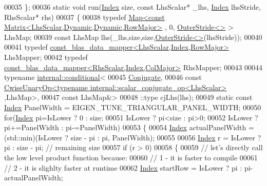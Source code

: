 \begin{DoxyCode}
00035   \};
00036   \textcolor{keyword}{static} \textcolor{keywordtype}{void} run(\hyperlink{namespace_eigen_a62e77e0933482dafde8fe197d9a2cfde}{Index} size, \textcolor{keyword}{const} LhsScalar* \_lhs, \hyperlink{namespace_eigen_a62e77e0933482dafde8fe197d9a2cfde}{Index} lhsStride, RhsScalar* rhs)
00037   \{
00038     \textcolor{keyword}{typedef} \hyperlink{group___core___module_class_eigen_1_1_map}{Map<const Matrix<LhsScalar,Dynamic,Dynamic,RowMajor>}
      , 0, \hyperlink{class_eigen_1_1_outer_stride}{OuterStride<>} > LhsMap;
00039     \textcolor{keyword}{const} LhsMap lhs(\_lhs,size,size,\hyperlink{class_eigen_1_1_outer_stride}{OuterStride<>}(lhsStride));
00040 
00041     \textcolor{keyword}{typedef} \hyperlink{class_eigen_1_1internal_1_1const__blas__data__mapper}{const\_blas\_data\_mapper<LhsScalar,Index,RowMajor>}
       LhsMapper;
00042     \textcolor{keyword}{typedef} \hyperlink{class_eigen_1_1internal_1_1const__blas__data__mapper}{const\_blas\_data\_mapper<RhsScalar,Index,ColMajor>}
       RhsMapper;
00043 
00044     \textcolor{keyword}{typename} \hyperlink{struct_eigen_1_1internal_1_1conditional}{internal::conditional}<
00045                           \hyperlink{class_eigen_1_1_conjugate}{Conjugate},
00046                           \textcolor{keyword}{const} 
      \hyperlink{group___core___module_class_eigen_1_1_cwise_unary_op}{CwiseUnaryOp<typename internal::scalar\_conjugate\_op<LhsScalar>}
      ,LhsMap>,
00047                           \textcolor{keyword}{const} LhsMap&>
00048                         ::type cjLhs(lhs);
00049     \textcolor{keyword}{static} \textcolor{keyword}{const} \hyperlink{namespace_eigen_a62e77e0933482dafde8fe197d9a2cfde}{Index} PanelWidth = EIGEN\_TUNE\_TRIANGULAR\_PANEL\_WIDTH;
00050     \textcolor{keywordflow}{for}(\hyperlink{namespace_eigen_a62e77e0933482dafde8fe197d9a2cfde}{Index} pi=IsLower ? 0 : size;
00051         IsLower ? pi<size : pi>0;
00052         IsLower ? pi+=PanelWidth : pi-=PanelWidth)
00053     \{
00054       \hyperlink{namespace_eigen_a62e77e0933482dafde8fe197d9a2cfde}{Index} actualPanelWidth = (std::min)(IsLower ? size - pi : pi, PanelWidth);
00055 
00056       \hyperlink{namespace_eigen_a62e77e0933482dafde8fe197d9a2cfde}{Index} r = IsLower ? pi : size - pi; \textcolor{comment}{// remaining size}
00057       \textcolor{keywordflow}{if} (r > 0)
00058       \{
00059         \textcolor{comment}{// let's directly call the low level product function because:}
00060         \textcolor{comment}{// 1 - it is faster to compile}
00061         \textcolor{comment}{// 2 - it is slighlty faster at runtime}
00062         \hyperlink{namespace_eigen_a62e77e0933482dafde8fe197d9a2cfde}{Index} startRow = IsLower ? pi : pi-actualPanelWidth;

\end{DoxyCode}
